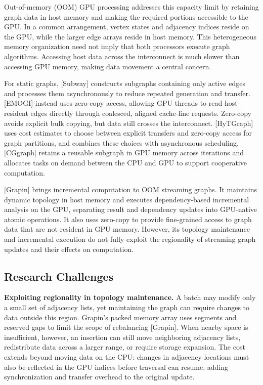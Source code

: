 Out-of-memory (OOM) GPU processing addresses this capacity limit by retaining graph data in host memory and making the required portions accessible to the GPU. In a common arrangement, vertex states and adjacency indices reside on the GPU, while the larger edge arrays reside in host memory. This heterogeneous memory organization need not imply that both processors execute graph algorithms. Accessing host data across the interconnect is much slower than accessing GPU memory, making data movement a central concern.

For static graphs, [Subway] constructs subgraphs containing only active edges and processes them asynchronously to reduce repeated generation and transfer. [EMOGI] instead uses zero-copy access, allowing GPU threads to read host-resident edges directly through coalesced, aligned cache-line requests. Zero-copy avoids explicit bulk copying, but data still crosses the interconnect. [HyTGraph] uses cost estimates to choose between explicit transfers and zero-copy access for graph partitions, and combines these choices with asynchronous scheduling. [CGgraph] retains a reusable subgraph in GPU memory across iterations and allocates tasks on demand between the CPU and GPU to support cooperative computation.

[Grapin] brings incremental computation to OOM streaming graphs. It maintains dynamic topology in host memory and executes dependency-based incremental analysis on the GPU, separating result and dependency updates into GPU-native atomic operations. It also uses zero-copy to provide fine-grained access to graph data that are not resident in GPU memory. However, its topology maintenance and incremental execution do not fully exploit the regionality of streaming graph updates and their effects on computation.

\subsection{Research Challenges}


\textbf{Exploiting regionality in topology maintenance.} A batch may modify only a small set of adjacency lists, yet maintaining the graph can require changes to data outside this region. Grapin's packed memory array uses segments and reserved gaps to limit the scope of rebalancing [Grapin]. When nearby space is insufficient, however, an insertion can still move neighboring adjacency lists, redistribute data across a larger range, or require storage expansion. The cost extends beyond moving data on the CPU: changes in adjacency locations must also be reflected in the GPU indices before traversal can resume, adding synchronization and transfer overhead to the original update.

